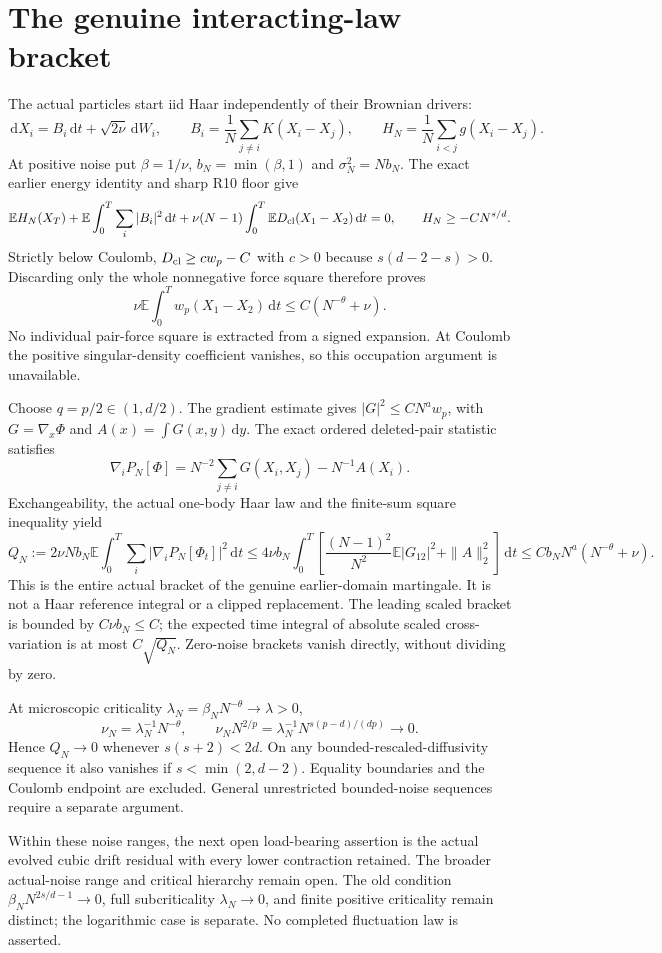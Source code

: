\documentclass[10pt]{article}
\newcommand{\E}{\mathbb E}
\newcommand{\dd}{\,\mathrm d}
\begin{document}
\newpage
\section*{The genuine interacting-law bracket}
The actual particles start iid Haar independently of their Brownian drivers:
\[
 \dd X_i=B_i\dd t+\sqrt{2\nu}\dd W_i,\qquad
 B_i=\frac1N\sum_{j\ne i}K(X_i-X_j),\qquad
 H_N=\frac1N\sum_{i<j}g(X_i-X_j).
\]
At positive noise put $\beta=1/\nu$, $b_N=\min(\beta,1)$ and
$\sigma_N^2=Nb_N$. The exact earlier energy identity and sharp R10 floor give
\[
 \E H_N(X_T)+\E\int_0^T\sum_i|B_i|^2\dd t
       +\nu(N-1)\int_0^T\E D_{\rm cl}(X_1-X_2)\dd t=0,
 \qquad H_N\ge-CN^{s/d}.
\]
Strictly below Coulomb,
$D_{\rm cl}\ge c w_p-C$ with $c>0$ because $s(d-2-s)>0$.
Discarding only the whole nonnegative force square therefore proves
\[
 \nu\E\int_0^T w_p(X_1-X_2)\dd t\le C(N^{-\theta}+\nu).
\]
No individual pair-force square is extracted from a signed expansion.
At Coulomb the positive singular-density coefficient vanishes, so this
occupation argument is unavailable.

Choose $q=p/2\in(1,d/2)$. The gradient estimate gives
$|G|^2\le C N^a w_p$, with $G=\nabla_x\Phi$ and
$A(x)=\int G(x,y)\dd y$. The exact ordered deleted-pair statistic satisfies
\[
 \nabla_iP_N[\Phi]=N^{-2}\sum_{j\ne i}G(X_i,X_j)-N^{-1}A(X_i).
\]
Exchangeability, the actual one-body Haar law and the finite-sum square
inequality yield
\[
 Q_N:=2\nu Nb_N\E\int_0^T\sum_i|\nabla_iP_N[\Phi_t]|^2\dd t
 \le4\nu b_N\int_0^T
 \left[\frac{(N-1)^2}{N^2}\E|G_{12}|^2+\|A\|_2^2\right]\dd t
 \le Cb_NN^a(N^{-\theta}+\nu).
\]
This is the entire actual bracket of the genuine earlier-domain
martingale. It is not a Haar reference integral or a clipped replacement.
The leading scaled bracket is bounded by $C\nu b_N\le C$; the expected
time integral of absolute scaled cross-variation is at most $C\sqrt{Q_N}$.
Zero-noise brackets vanish directly, without dividing by zero.

At microscopic criticality $\lambda_N=\beta_NN^{-\theta}\to\lambda>0$,
\[
 \nu_N=\lambda_N^{-1}N^{-\theta},\qquad
 \nu_NN^{2/p}=\lambda_N^{-1}N^{s(p-d)/(dp)}\longrightarrow0.
\]
Hence $Q_N\to0$ whenever $s(s+2)<2d$. On any bounded-rescaled-diffusivity
sequence it also vanishes if $s<\min(2,d-2)$. Equality boundaries and the
Coulomb endpoint are excluded. General unrestricted bounded-noise
sequences require a separate argument.

\medskip\noindent
Within these noise ranges, the next open load-bearing assertion is the
actual evolved cubic drift residual with every lower contraction retained.
The broader actual-noise range and critical hierarchy remain open. The old
condition $\beta_NN^{2s/d-1}\to0$, full subcriticality $\lambda_N\to0$,
and finite positive criticality remain distinct; the logarithmic case is
separate. No completed fluctuation law is asserted.
\end{document}
